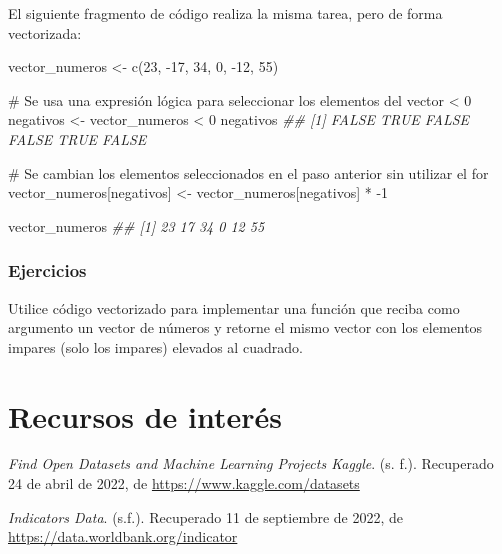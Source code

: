\documentclass[
  letterpaper,
  DIV=11,
  numbers=noendperiod]{scrreprt}
\newenvironment{Shaded}{\begin{snugshade}}{\end{snugshade}}
\newcommand{\CommentTok}[1]{\textcolor[rgb]{0.37,0.37,0.37}{#1}}
\newcommand{\DecValTok}[1]{\textcolor[rgb]{0.68,0.00,0.00}{#1}}
\newcommand{\DocumentationTok}[1]{\textcolor[rgb]{0.37,0.37,0.37}{\textit{#1}}}
\newcommand{\FunctionTok}[1]{\textcolor[rgb]{0.28,0.35,0.67}{#1}}
\newcommand{\NormalTok}[1]{\textcolor[rgb]{0.00,0.23,0.31}{#1}}
\newcommand{\OtherTok}[1]{\textcolor[rgb]{0.00,0.23,0.31}{#1}}
\newcommand{\SpecialCharTok}[1]{\textcolor[rgb]{0.37,0.37,0.37}{#1}}
\begin{document}
El siguiente fragmento de código realiza la misma tarea, pero de forma
vectorizada:

\begin{Shaded}
\begin{Highlighting}[]
\NormalTok{vector\_numeros }\OtherTok{\textless{}{-}} \FunctionTok{c}\NormalTok{(}\DecValTok{23}\NormalTok{, }\SpecialCharTok{{-}}\DecValTok{17}\NormalTok{, }\DecValTok{34}\NormalTok{, }\DecValTok{0}\NormalTok{, }\SpecialCharTok{{-}}\DecValTok{12}\NormalTok{, }\DecValTok{55}\NormalTok{)}

\CommentTok{\# Se usa una expresión lógica para seleccionar los elementos del vector \textless{} 0}
\NormalTok{negativos }\OtherTok{\textless{}{-}}\NormalTok{ vector\_numeros }\SpecialCharTok{\textless{}} \DecValTok{0}
\NormalTok{negativos}
\DocumentationTok{\#\# [1] FALSE  TRUE FALSE FALSE  TRUE FALSE}

\CommentTok{\# Se cambian los elementos seleccionados en el paso anterior sin utilizar el for}
\NormalTok{vector\_numeros[negativos] }\OtherTok{\textless{}{-}}\NormalTok{ vector\_numeros[negativos] }\SpecialCharTok{*} \SpecialCharTok{{-}}\DecValTok{1}

\NormalTok{vector\_numeros}
\DocumentationTok{\#\# [1] 23 17 34  0 12 55}
\end{Highlighting}
\end{Shaded}

\hypertarget{ejercicios-11}{%
\subsubsection{Ejercicios}\label{ejercicios-11}}

Utilice código vectorizado para implementar una función que reciba como
argumento un vector de números y retorne el mismo vector con los
elementos impares (solo los impares) elevados al cuadrado.

\hypertarget{recursos-de-interuxe9s-2}{%
\section{Recursos de interés}\label{recursos-de-interuxe9s-2}}

\emph{Find Open Datasets and Machine Learning Projects \textbar{}
Kaggle}. (s. f.). Recuperado 24 de abril de 2022, de
\url{https://www.kaggle.com/datasets}

\emph{Indicators \textbar{} Data}. (s.f.). Recuperado 11 de septiembre
de 2022, de \url{https://data.worldbank.org/indicator}
\end{document}
